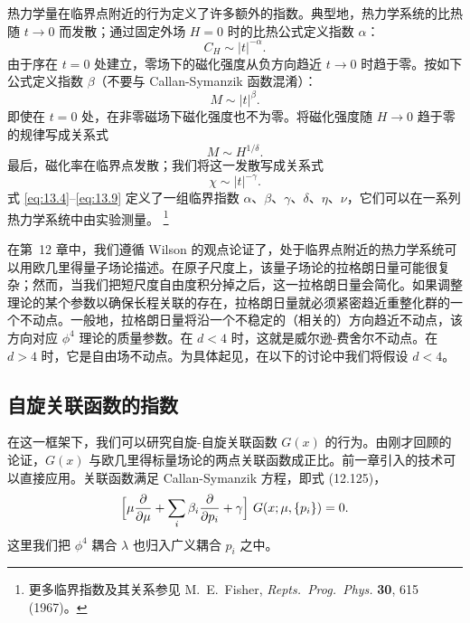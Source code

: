 热力学量在临界点附近的行为定义了许多额外的指数。典型地，热力学系统的比热随 $t\to 0$ 而发散；通过固定外场 $H=0$ 时的比热公式定义指数 $\alpha$：
\begin{equation}
  C_H \sim |t|^{-\alpha} .
  \label{eq:13.6}
\end{equation}
由于序在 $t=0$ 处建立，零场下的磁化强度从负方向趋近 $t\to 0$ 时趋于零。按如下公式定义指数 $\beta$（不要与 Callan-Symanzik 函数混淆）：
\begin{equation}
  M \sim |t|^{\beta} .
  \label{eq:13.7}
\end{equation}
即使在 $t=0$ 处，在非零磁场下磁化强度也不为零。将磁化强度随 $H\to 0$ 趋于零的规律写成关系式
\begin{equation}
  M \sim H^{1/\delta} .
  \label{eq:13.8}
\end{equation}
最后，磁化率在临界点发散；我们将这一发散写成关系式
\begin{equation}
  \chi \sim |t|^{-\gamma} .
  \label{eq:13.9}
\end{equation}
式 \eqref{eq:13.4}--\eqref{eq:13.9} 定义了一组临界指数 $\alpha$、$\beta$、$\gamma$、$\delta$、$\eta$、$\nu$，它们可以在一系列热力学系统中由实验测量。%
\footnote{更多临界指数及其关系参见 M.~E.~Fisher, \emph{Repts.\ Prog.\ Phys.} \textbf{30}, 615 (1967)。}

在第~12 章中，我们遵循 Wilson 的观点论证了，处于临界点附近的热力学系统可以用欧几里得量子场论描述。在原子尺度上，该量子场论的拉格朗日量可能很复杂；然而，当我们把短尺度自由度积分掉之后，这一拉格朗日量会简化。如果调整理论的某个参数以确保长程关联的存在，拉格朗日量就必须紧密趋近重整化群的一个不动点。一般地，拉格朗日量将沿一个不稳定的（相关的）方向趋近不动点，该方向对应 $\phi^4$ 理论的质量参数。在 $d<4$ 时，这就是威尔逊-费舍尔不动点。在 $d>4$ 时，它是自由场不动点。为具体起见，在以下的讨论中我们将假设 $d<4$。

\subsection{自旋关联函数的指数}

在这一框架下，我们可以研究自旋-自旋关联函数 $G(x)$ 的行为。由刚才回顾的论证，$G(x)$ 与欧几里得标量场论的两点关联函数成正比。前一章引入的技术可以直接应用。关联函数满足 Callan-Symanzik 方程，即式 (12.125)，
\begin{equation}
  \Bigl[ \mu\frac{\partial}{\partial\mu} + \sum_i \beta_i\frac{\partial}
    {\partial p_i} + \gamma \Bigr]\ G(x; \mu, \{p_i\}) = 0 .
  \label{eq:13.10}
\end{equation}
这里我们把 $\phi^4$ 耦合 $\lambda$ 也归入广义耦合 $p_i$ 之中。

